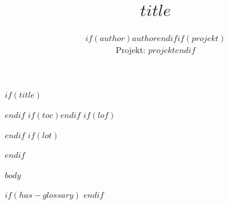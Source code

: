 \documentclass[11pt]{article}
\title{$title$}
\author{$if(author)$$author$$endif$$if(projekt)$\\ Projekt: $projekt$$endif$}
\theoremstyle{plain}
\theoremstyle{definition}
\theoremstyle{remark}
\begin{document}
$if(title)$\maketitle$endif$
$if(toc)$\tableofcontents\newpage$endif$
$if(lof)$\listoffigures$endif$
$if(lot)$\listoftables$endif$

$body$

$if(has-glossary)$
\clearpage
\printglossary[type=\acronymtype, title={Acronyms}]
\printglossary[title={Glossary}]
$endif$
\end{document}
